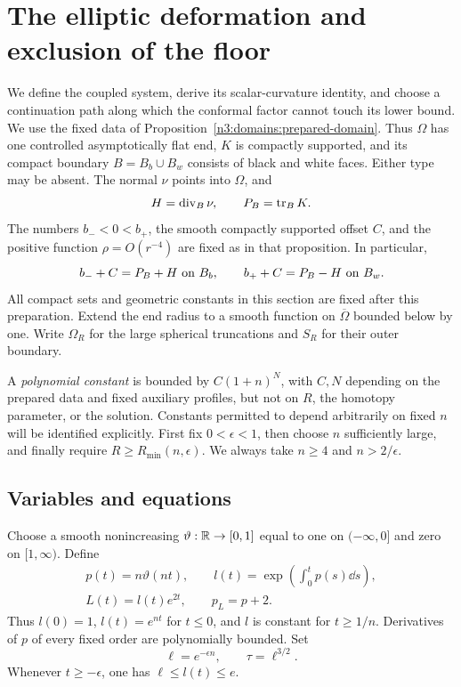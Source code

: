 \section{The elliptic deformation and exclusion of the floor}
\label{n3:deformation:section}

We define the coupled system, derive its scalar-curvature identity, and
choose a continuation path along which the conformal factor cannot touch
its lower bound.  We use the fixed data of
Proposition~\ref{n3:domains:prepared-domain}. Thus $\Omega$ has one controlled
asymptotically flat end, $K$ is compactly supported, and its compact boundary
$B=B_b\cup B_w$ consists of black and white faces. Either type may be absent.
The normal $\nu$ points into $\Omega$, and
\[
 H=\operatorname{div}_B\nu,\qquad P_B=\operatorname{tr}_BK.
\]
The numbers $b_-<0<b_+$, the smooth compactly supported offset $C$, and
the positive function $\rho=O(r^{-4})$ are fixed as in that proposition.
In particular,
\begin{equation}\label{n3:deformation:face-thresholds}
 b_-+C=P_B+H\ \hbox{on }B_b,\qquad
 b_++C=P_B-H\ \hbox{on }B_w.
\end{equation}
All compact sets and geometric constants in this section are fixed after
this preparation. Extend the end radius to a smooth function on
$\overline\Omega$ bounded below by one. Write $\Omega_R$ for the large
spherical truncations and $S_R$ for their outer boundary.

A \emph{polynomial constant} is bounded by $C(1+n)^N$, with $C,N$
depending on the prepared data and fixed auxiliary profiles, but not on
$R$, the homotopy parameter, or the solution. Constants permitted to
depend arbitrarily on fixed $n$ will be identified explicitly.
First fix $0<\epsilon<1$, then choose $n$ sufficiently large, and finally
require $R\ge R_{\min}(n,\epsilon)$. We always take $n\ge4$ and
$n>2/\epsilon$.

\subsection{Variables and equations}
\label{n3:deformation:variables}

Choose a smooth nonincreasing $\vartheta:\mathbb R\to[0,1]$ equal to one on
$(-\infty,0]$ and zero on $[1,\infty)$. Define
\begin{equation}\label{n3:deformation:l-profile}
 \begin{gathered}
 p(t)=n\vartheta(nt),\qquad
 l(t)=\exp\left(\int_0^t p(s)\dd s\right),\\
 L(t)=l(t)e^{2t},\qquad p_L=p+2.
 \end{gathered}
\end{equation}
Thus $l(0)=1$, $l(t)=e^{nt}$ for $t\le0$, and $l$ is constant for
$t\ge1/n$. Derivatives of $p$ of every fixed order are polynomially bounded.
Set
\begin{equation}\label{n3:deformation:small-parameters}
 \ell=e^{-\epsilon n},\qquad \tau=\ell^{3/2}.
\end{equation}
Whenever $t\ge-\epsilon$, one has $\ell\le l(t)\le e$.

